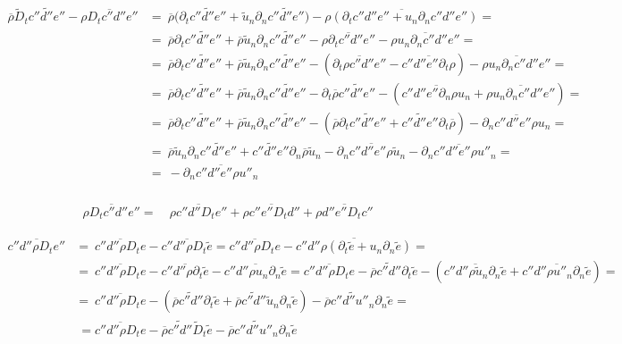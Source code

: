 \documentclass[10pt,paper=a4]{report}
\newcommand{\eht}{\overline}
\newcommand{\fht}{\widetilde}
\begin{document}
\begin{align}
\eht{\rho}\fht{D}_t \fht{c''d''e''} - \eht{\rho D_t c''d''e''} & = \ \eht{\rho}\big(\partial_t \fht{c''d''e''} + \fht{u}_n\partial_n \fht{c''d''e''} \big) - \eht{\rho ( \partial_t c''d''e'' + u_n \partial_n c''d''e'' )} = \\
& = \ \eht{\rho}\partial_t \fht{c''d''e''} + \eht{\rho}\fht{u}_n\partial_n \fht{c''d''e''} - \eht{\rho \partial_t c''d''e''} - \eht{\rho u_n \partial_n c''d''e''} = \\
& = \ \eht{\rho}\partial_t \fht{c''d''e''} + \eht{\rho}\fht{u}_n\partial_n \fht{c''d''e''} - (\eht{\partial_t \rho c''d''e''} - \eht{c''d''e''\partial_t \rho}) - \eht{\rho u_n \partial_n c''d''e''} = \\
& = \ \eht{\rho}\partial_t \fht{c''d''e''} + \eht{\rho}\fht{u}_n\partial_n \fht{c''d''e''} - \partial_t \eht{\rho} \fht{c''d''e''} - (\eht{c''d''e''\partial_n \rho u_n} + \eht{\rho u_n \partial_n c''d''e''}) = \\
& = \ \eht{\rho}\partial_t \fht{c''d''e''} + \eht{\rho}\fht{u}_n\partial_n \fht{c''d''e''} - (\eht{\rho}\partial_t \fht{c''d''e''} + \fht{c''d''e''}\partial_t \eht{\rho} ) - \eht{\partial_n c''d''e'' \rho u_n} =  \\
& = \ \eht{\rho}\fht{u}_n\partial_n \fht{c''d''e''} + \fht{c''d''e''}\partial_n \eht{\rho}\fht{u}_n  - \eht{\partial_n c''d''e'' \rho \fht{u}_n} - \eht{\partial_n c''d''e'' \rho u''_n} = \\
& = \ - \eht{\partial_n c''d''e'' \rho u''_n} \\
\end{align}

\begin{align}
\eht{\rho D_t c''d''e''} = & \ \eht{\rho c''d'' D_t e''} + \eht{\rho c''e'' D_t d''} + \eht{\rho d''e'' D_t c''}
\end{align}

\begin{align}
\eht{c''d''\rho D_t e''} & = \ \eht{c''d''\rho D_t e} - \eht{c''d''\rho D_t \fht{e}} = \eht{c''d''\rho D_t e} - \eht{c''d''\rho (\partial_t \fht{e} + u_n \partial_n \fht{e}) } = \\
& = \ \eht{c''d''\rho D_t e} - \eht{c''d''\rho \partial_t \fht{e}} - \eht{c''d''\rho u_n \partial_n \fht{e}} = \eht{c''d''\rho D_t e} - \eht{\rho} \fht{c''d''}\partial_t \fht{e} - (\eht{c''d''\rho \fht{u}_n \partial_n \fht{e}} + \eht{c''d''\rho u''_n \partial_n \fht{e}} ) =  \\
& = \ \eht{c''d''\rho D_t e} - (\eht{\rho}\fht{c''d''}\partial_t \fht{e} + \eht{\rho}\fht{c''d''}\fht{u}_n \partial_n \fht{e}) - \eht{\rho} \fht{c''d''u''_n}\partial_n\fht{e} = \\
& \ = \eht{c''d''\rho D_t e} - \eht{\rho}\fht{c''d''}\fht{D}_t \fht{e} - \eht{\rho}\fht{c''d''u''_n} \partial_n \fht{e} 
\end{align}
\end{document}
